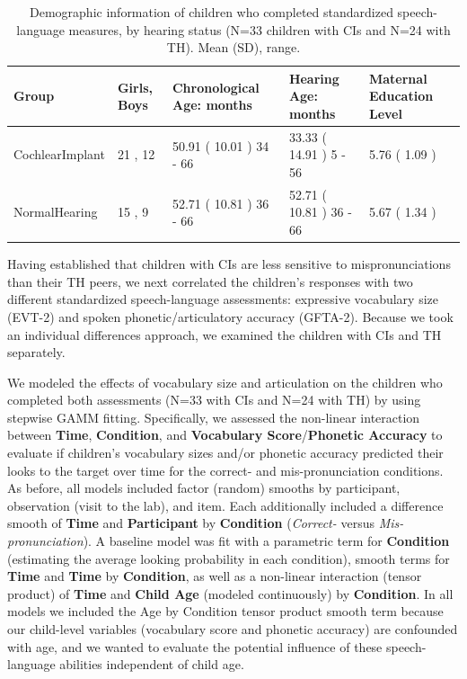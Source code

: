 \documentclass[
]{article}
\begin{document}
\begin{table}[!h]

\caption{\label{tab:demo-tab-allkids}Demographic information of children who completed standardized speech-language measures, by hearing status (N=33 children with CIs and N=24 with TH). Mean (SD), range.}
\centering
\begin{tabular}[t]{lllll}
\toprule
Group & Girls, Boys & Chronological Age: months & Hearing Age: months & Maternal Education Level\\
\midrule
CochlearImplant & 21 , 12 & 50.91 ( 10.01 ) 34 - 66 & 33.33 ( 14.91 ) 5 - 56 & 5.76 ( 1.09 )\\
NormalHearing & 15 , 9 & 52.71 ( 10.81 ) 36 - 66 & 52.71 ( 10.81 ) 36 - 66 & 5.67 ( 1.34 )\\
\bottomrule
\end{tabular}
\end{table}

Having established that children with CIs are less sensitive to mispronunciations than their TH peers, we next correlated the children's responses with two different standardized speech-language assessments: expressive vocabulary size (EVT-2) and spoken phonetic/articulatory accuracy (GFTA-2). Because we took an individual differences approach, we examined the children with CIs and TH separately.

We modeled the effects of vocabulary size and articulation on the children who completed both assessments (N=33 with CIs and N=24 with TH) by using stepwise GAMM fitting. Specifically, we assessed the non-linear interaction between \textbf{Time}, \textbf{Condition}, and \textbf{Vocabulary Score}/\textbf{Phonetic Accuracy} to evaluate if children's vocabulary sizes and/or phonetic accuracy predicted their looks to the target over time for the correct- and mis-pronunciation conditions. As before, all models included factor (random) smooths by participant, observation (visit to the lab), and item. Each additionally included a difference smooth of \textbf{Time} and \textbf{Participant} by \textbf{Condition} (\emph{Correct-} versus \emph{Mis-pronunciation}). A baseline model was fit with a parametric term for \textbf{Condition} (estimating the average looking probability in each condition), smooth terms for \textbf{Time} and \textbf{Time} by \textbf{Condition}, as well as a non-linear interaction (tensor product) of \textbf{Time} and \textbf{Child Age} (modeled continuously) by \textbf{Condition}. In all models we included the Age by Condition tensor product smooth term because our child-level variables (vocabulary score and phonetic accuracy) are confounded with age, and we wanted to evaluate the potential influence of these speech-language abilities independent of child age.
\end{document}
